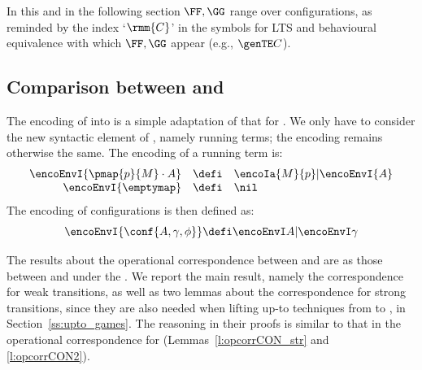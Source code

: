 In this and in the following section $\FF,\GG$ range over \COGS configurations, as reminded
by the index `$\rmm{C}$'
  in the symbols for LTS and behavioural equivalence with  which $\FF,\GG$ appear (e.g.,
  $\genTE C$).


\subsection{Comparison between \COGS and \piI}
\label{ss:compa_cogs_piI}

The encoding of \COGS into \piI is a simple adaptation of that for \AOGS.
We only have to consider the new syntactic element of \COGS, 
namely running
terms; the encoding remains otherwise the same.
The encoding of a running term is: 
\[ 
\begin{array}{rcl}
\encoEnvI{\pmap{p}{M}\cdot A  } & \defi & 
 \encoIa {M}{p} |\encoEnvI{ A  } \\
\encoEnvI{\emptymap} & \defi & \nil
\end{array} 
\]
The encoding of configurations is then defined as:
\[
\encoEnvI{\conf{A, \gamma, \phi}}
\defi \encoEnvI A | \encoEnvI \gamma
\]

The results about the operational correspondence between \COGS and \piI 
are as those between \AOGS and \piI under the \opLTS. 
\DSOCTb
We  report the main result, namely the correspondence for weak transitions, as well as 
two lemmas about the  correspondence for strong transitions, since they are also needed
when lifting up-to techniques from 
 \piI to \COGS, in Section~\ref{ss:upto_games}.
The reasoning in their proofs is similar to that 
in the operational  correspondence for \AOGS
(Lemmas~\ref{l:opcorrCON_str} and
\ref{l:opcorrCON2}). 

